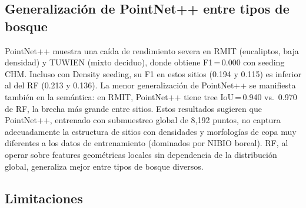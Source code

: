 \documentclass[runningheads]{llncs}
\begin{document}
\subsection{Generalizaci\'on de PointNet++ entre tipos de bosque}

PointNet++ muestra una ca\'ida de rendimiento severa en RMIT (eucaliptos, baja densidad) y TUWIEN (mixto deciduo), donde obtiene F1\,=\,0.000 con seeding CHM. Incluso con Density seeding, su F1 en estos sitios (0.194 y 0.115) es inferior al del RF (0.213 y 0.136). La menor generalizaci\'on de PointNet++ se manifiesta tambi\'en en la sem\'antica: en RMIT, PointNet++ tiene tree IoU\,=\,0.940 vs.\ 0.970 de RF, la brecha m\'as grande entre sitios. Estos resultados sugieren que PointNet++, entrenado con submuestreo global de 8{,}192 puntos, no captura adecuadamente la estructura de sitios con densidades y morfolog\'ias de copa muy diferentes a los datos de entrenamiento (dominados por NIBIO boreal). RF, al operar sobre features geom\'etricas locales sin dependencia de la distribuci\'on global, generaliza mejor entre tipos de bosque diversos.

\subsection{Limitaciones}
\end{document}
